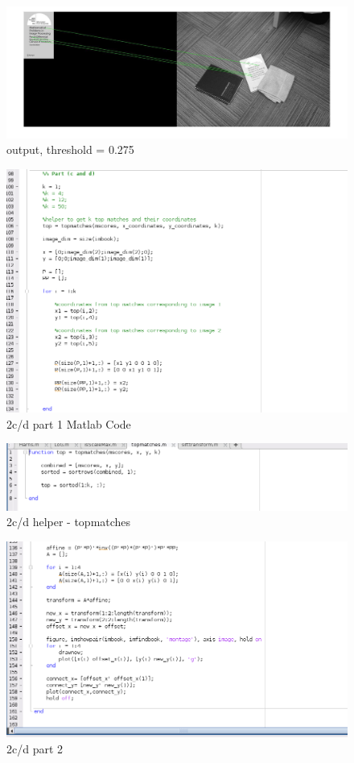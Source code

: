\documentclass[]{article}
\begin{document}
\begin{figure}[h!]
\centering
\includegraphics[width=1.35\textwidth]{img/2b-t0275.jpg}
\caption{output, threshold = 0.275}
\end{figure}


\begin{figure}[h!]
\centering
\includegraphics[width=1.35\textwidth]{img/2c1-code.png}
\caption{2c/d part 1 Matlab Code}
\end{figure}
\begin{figure}[h!]
\centering
\includegraphics[width=1.35\textwidth]{img/2c2-code.png}
\caption{2c/d helper - topmatches }
\end{figure}
\begin{figure}[h!]
\centering
\includegraphics[width=1.35\textwidth]{img/2c3-code.png}
\caption{2c/d part 2}
\end{figure}
\end{document}
